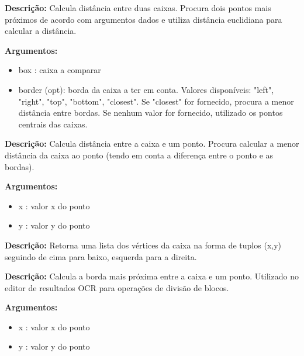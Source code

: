 
\textbf{Descrição:} Calcula distância entre duas caixas. Procura dois pontos mais próximos de acordo com argumentos dados e utiliza distância euclidiana para calcular a distância.

\textbf{Argumentos:}
\begin{itemize}\setlength\itemsep{-0.3em}
	\item box : caixa a comparar
	\item border (opt): borda da caixa a ter em conta. Valores disponíveis: "left", "right", "top", "bottom", "closest". Se "closest" for fornecido, procura a menor distância entre bordas. Se nenhum valor for fornecido, utilizado os pontos centrais das caixas.
\end{itemize}



\textbf{Descrição:} Calcula distância entre a caixa e um ponto. Procura calcular a menor distância da caixa ao ponto (tendo em conta a diferença entre o ponto e as bordas).

\textbf{Argumentos:}
\begin{itemize}\setlength\itemsep{-0.3em}
	\item x : valor x do ponto
	\item y : valor y do ponto
\end{itemize}


\textbf{Descrição:} Retorna uma lista dos vértices da caixa na forma de tuplos (x,y) seguindo de cima para baixo, esquerda para a direita.



\textbf{Descrição:} Calcula a borda mais próxima entre a caixa e um ponto. Utilizado no editor de resultados OCR para operações de divisão de blocos.

\textbf{Argumentos:}
\begin{itemize}\setlength\itemsep{-0.3em}
	\item x : valor x do ponto
	\item y : valor y do ponto
\end{itemize}






